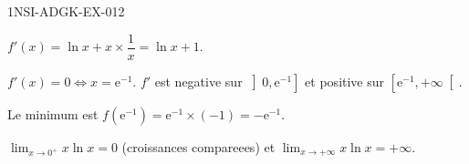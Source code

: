 \begin{corrige}{1NSI-ADGK-EX-012}

$f'(x) = \ln x + x \times \dfrac{1}{x} = \ln x + 1$.


$f'(x) = 0 \iff x = \mathrm{e}^{-1}$. $f'$ est negative sur $\left]0, \mathrm{e}^{-1}\right]$ et positive sur $\left[\mathrm{e}^{-1}, +\infty\right[$.

Le minimum est $f(\mathrm{e}^{-1}) = \mathrm{e}^{-1} \times (-1) = -\mathrm{e}^{-1}$.

$\lim_{x \to 0^+} x\ln x = 0$ (croissances compareees) et $\lim_{x \to +\infty} x\ln x = +\infty$.

\end{corrige}
